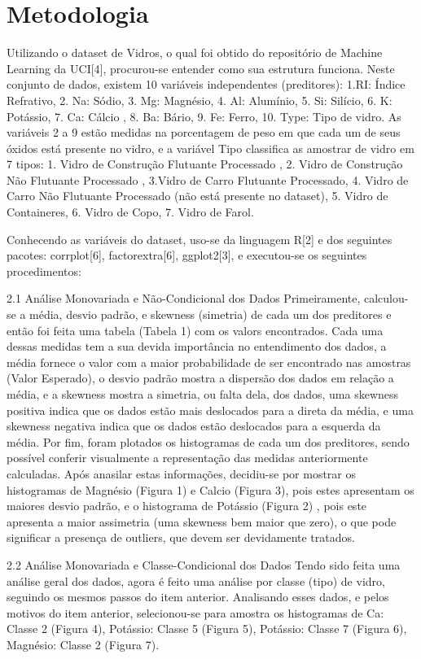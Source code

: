 \documentclass[conference]{IEEEtran}
\begin{document}
\section{Metodologia}

Utilizando o dataset de Vidros, o qual foi obtido do repositório de Machine Learning da UCI[4], procurou-se entender como sua estrutura funciona. Neste conjunto de dados, 
existem 10 variáveis independentes (preditores): 1.RI: Índice Refrativo, 2. Na: Sódio, 3. Mg: Magnésio, 4. Al: Alumínio, 5. Si: Silício, 6. K: Potássio, 7. Ca: Cálcio , 8. Ba: Bário, 
9. Fe: Ferro, 10. Type: Tipo de vidro. As variáveis 2 a 9 estão medidas na porcentagem de peso em que cada um de seus óxidos está presente no vidro, e a variável Tipo classifica
as amostrar de vidro em 7 tipos: 1. Vidro de Construção Flutuante Processado , 2. Vidro de Construção Não Flutuante Processado ,
3.Vidro de Carro Flutuante Processado, 4. Vidro de Carro Não Flutuante Processado (não está presente no dataset), 5. Vidro de Containeres, 6. Vidro de Copo, 7. Vidro de Farol.

Conhecendo as variáveis do dataset, uso-se da linguagem R[2] e dos seguintes pacotes: corrplot[6], factorextra[6], ggplot2[3], e executou-se os seguintes procedimentos:

2.1 Análise Monovariada e Não-Condicional dos Dados
	Primeiramente, calculou-se a média, desvio padrão, e skewness (simetria) de cada um dos preditores e então foi feita uma tabela (Tabela 1) com os valors encontrados.
	Cada uma dessas medidas tem a sua devida importância no entendimento dos dados, a média fornece o valor com a maior probabilidade de ser encontrado nas amostras (Valor Esperado),
	o desvio padrão mostra a dispersão dos dados em relação a média, e a skewness mostra a simetria, ou falta dela, dos dados, uma skewness positiva indica que os dados estão mais deslocados
	para a direta da média, e uma skewness negativa indica que os dados estão deslocados para a esquerda da média.
	Por fim, foram plotados os histogramas de cada um dos preditores, sendo possível conferir visualmente a representação das medidas anteriormente calculadas.
	Após anasilar estas informações, decidiu-se por mostrar os histogramas de Magnésio (Figura 1) e Calcio (Figura 3), pois estes apresentam os maiores desvio padrão, e o histograma de Potássio (Figura 2) , pois este apresenta a maior 
	assimetria (uma skewness bem maior que zero), o que pode significar a presença de outliers, que devem ser devidamente tratados.

2.2 Análise Monovariada e Classe-Condicional dos Dados
	Tendo sido feita uma análise geral dos dados, agora é feito uma análise por classe (tipo) de vidro, seguindo os mesmos passos do item anterior.
	Analisando esses dados, e pelos motivos do item anterior, selecionou-se para amostra os histogramas de Ca: Classe 2 (Figura 4), Potássio: Classe 5 (Figura 5),
	Potássio: Classe 7 (Figura 6), Magnésio: Classe 2 (Figura 7).
	
\end{document}
